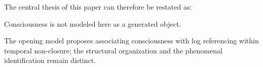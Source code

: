 The central thesis of this paper can therefore be restated as:

Consciousness is not modeled here as a generated object.

The opening model proposes associating consciousness with log referencing within temporal non-closure; the structural organization and the phenomenal identification remain distinct.

